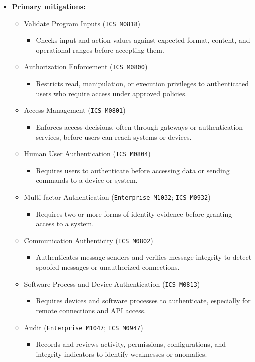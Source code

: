\documentclass[10pt,a4paper,oneside]{report}
\begin{document}
\begin{itemize}
\item \textbf{Primary mitigations:}
\begin{itemize}
\item Validate Program Inputs (\texttt{ICS M0818})
\begin{itemize}
\item Checks input and action values against expected format, content, and operational ranges before accepting them.
\end{itemize}
\item Authorization Enforcement (\texttt{ICS M0800})
\begin{itemize}
\item Restricts read, manipulation, or execution privileges to authenticated users who require access under approved policies.
\end{itemize}
\item Access Management (\texttt{ICS M0801})
\begin{itemize}
\item Enforces access decisions, often through gateways or authentication services, before users can reach systems or devices.
\end{itemize}
\item Human User Authentication (\texttt{ICS M0804})
\begin{itemize}
\item Requires users to authenticate before accessing data or sending commands to a device or system.
\end{itemize}
\item Multi-factor Authentication (\texttt{Enterprise M1032}; \texttt{ICS M0932})
\begin{itemize}
\item Requires two or more forms of identity evidence before granting access to a system.
\end{itemize}
\item Communication Authenticity (\texttt{ICS M0802})
\begin{itemize}
\item Authenticates message senders and verifies message integrity to detect spoofed messages or unauthorized connections.
\end{itemize}
\item Software Process and Device Authentication (\texttt{ICS M0813})
\begin{itemize}
\item Requires devices and software processes to authenticate, especially for remote connections and API access.
\end{itemize}
\item Audit (\texttt{Enterprise M1047}; \texttt{ICS M0947})
\begin{itemize}
\item Records and reviews activity, permissions, configurations, and integrity indicators to identify weaknesses or anomalies.
\end{itemize}
\end{itemize}
\end{itemize}
\end{document}

